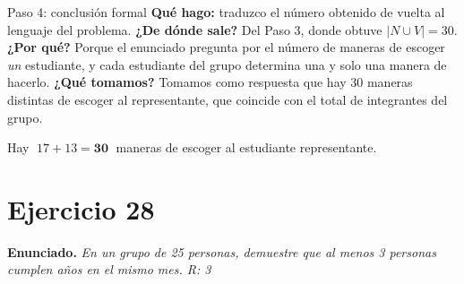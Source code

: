 \documentclass[11pt]{article}
\begin{document}
\begin{sol}
\begin{paso}{Paso 4: conclusi\'on formal}
\textbf{Qu\'e hago:} traduzco el n\'umero obtenido de vuelta al lenguaje del problema.
\textbf{¿De d\'onde sale?} Del Paso 3, donde obtuve $|N\cup V|=30$.
\textbf{¿Por qu\'e?} Porque el enunciado pregunta por el n\'umero de maneras de escoger \emph{un} estudiante, y cada estudiante del grupo determina una y solo una manera de hacerlo.
\textbf{¿Qu\'e tomamos?} Tomamos como respuesta que hay $30$ maneras distintas de escoger al representante, que coincide con el total de integrantes del grupo.
\end{paso}

\end{sol}

\begin{resp}
Hay $\;17+13=\mathbf{30}\;$ maneras de escoger al estudiante representante.
\end{resp}

\section*{Ejercicio 28}

\textbf{Enunciado.} \emph{En un grupo de 25 personas, demuestre que al menos 3 personas cumplen a\~nos en el mismo mes. R: 3}
\end{document}
